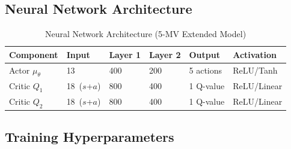 \documentclass[12pt,a4paper]{article}
\begin{document}
\subsection{Neural Network Architecture}

\begin{table}[H]
  \centering
  \caption{Neural Network Architecture (5-MV Extended Model)}
  \label{tab:nn}
  \renewcommand{\arraystretch}{1.3}
  \begin{tabular}{@{}llllll@{}}
    \toprule
    \textbf{Component} & \textbf{Input} & \textbf{Layer 1}
      & \textbf{Layer 2} & \textbf{Output} & \textbf{Activation} \\
    \midrule
    Actor $\mu_\theta$      & 13           & 400 & 200 & 5 actions  & ReLU/Tanh   \\
    Critic $Q_1$            & 18~($s$+$a$) & 800 & 400 & 1 Q-value  & ReLU/Linear \\
    Critic $Q_2$            & 18~($s$+$a$) & 800 & 400 & 1 Q-value  & ReLU/Linear \\
    \bottomrule
  \end{tabular}
\end{table}

\subsection{Training Hyperparameters}
\end{document}
